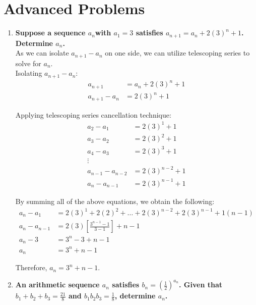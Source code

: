 \documentclass[12pt]{article}
\begin{document}
\section*{Advanced Problems}
\begin{enumerate}
    \item \textbf{Suppose a sequence ${a_n}$with $a_1 = 3$ satisfies $a_{n + 1} = a_n + 2(3)^n + 1$. Determine $a_n$.} \\
    
    As we can isolate $a_{n + 1} - a_{n}$ on one side, we can utilize telescoping series to solve for $a_n$. \\
    
    Isolating $a_{n + 1} - a_n$:
    \begin{align*}
        a_{n+1} & = a_n + 2(3)^n + 1 \\
        a_{n + 1} - a_n & = 2(3)^n + 1
    \end{align*}
    
    Applying telescoping series cancellation technique:
    \begin{align*}
        a_{2} - a_1 & = 2(3)^1 + 1 \\
        a_{3} - a_2 & = 2(3)^2 + 1 \\
        a_{4} - a_3 & = 2(3)^3 + 1 \\
        \vdots & \\
        a_{n-1} - a_{n - 2} & = 2(3)^{n - 2} + 1 \\
        a_{n} - a_{n - 1} & = 2(3)^{n - 1} + 1
    \end{align*}
    
    By summing all of the above equations, we obtain the following:
    \begin{align*}
        a_{n} - a_{1} & = 2(3)^1 + 2(2)^2 + \dots + 2(3)^{n - 2} + 2(3)^{n - 1} + 1(n - 1) \\
        a_{n} - a_{n - 1} & = 2(3)[\frac{3^{n - 1} - 1}{3 - 1}] + n - 1 \\
        a_{n} - 3 & = 3^n - 3 + n - 1 \\
        a_{n} & = 3^n + n - 1
    \end{align*}

    Therefore, $a_n = 3^n + n - 1$.
    
    \newpage

    \item \textbf{An arithmetic sequence ${a_n}$ satisfies $b_n = (\frac{1}{2})^{a_n}$. Given that $b_1 + b_2 + b_3 = \frac{21}{8}$ and $b_1b_2b_3 = \frac{1}{8}$, determine $a_n$.} \\
    

\end{enumerate}
\end{document}
